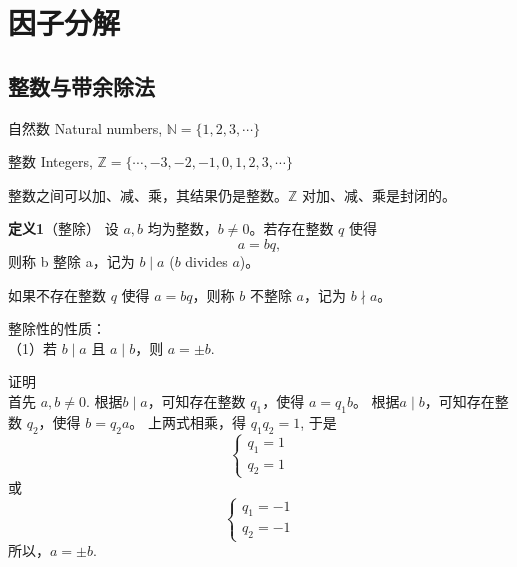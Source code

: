 \section{因子分解}
\subsection{整数与带余除法}

自然数 Natural numbers, 
$ \mathbb{N} = \{ 1, 2, 3, \cdots \} $

整数 Integers, 
$ \mathbb{Z} = \{ \cdots, -3, -2, -1, 0, 1, 2, 3, \cdots \} $

整数之间可以加、减、乘，其结果仍是整数。$ \mathbb{Z} $ 对加、减、乘是封闭的。

\textbf{定义1}（整除） 设 $a, b$ 均为整数，$ b \neq 0 $。若存在整数 $ q $ 使得
\[ 
    a = bq,
\]
则称 b 整除 a，记为 $ b \mid a $ ($b$ divides $a$)。

如果不存在整数 $q$ 使得 $a=bq$，则称 $b$ 不整除 $a$，记为 $b \nmid a$。

整除性的性质：\\
（1）若 $ b \mid a $ 且 $ a \mid b$，则 $a = \pm b$.

证明\\
首先 $a,b\neq 0$.
根据$ b \mid a $，可知存在整数 $q_1$，使得 $a=q_1 b$。
根据$ a \mid b$，可知存在整数 $q_2$，使得 $b=q_2 a$。
上两式相乘，得 $q_1 q_2 = 1$, 于是\\
\[
    \left\{ 
        \begin{array}{lc}
            q_1 = 1\\
            q_2 = 1
        \end{array}
    \right.
\]
或
\[
    \left\{ 
        \begin{array}{lc}
            q_1 = -1\\
            q_2 = -1
        \end{array}
    \right.
\]
所以，$a = \pm b$.